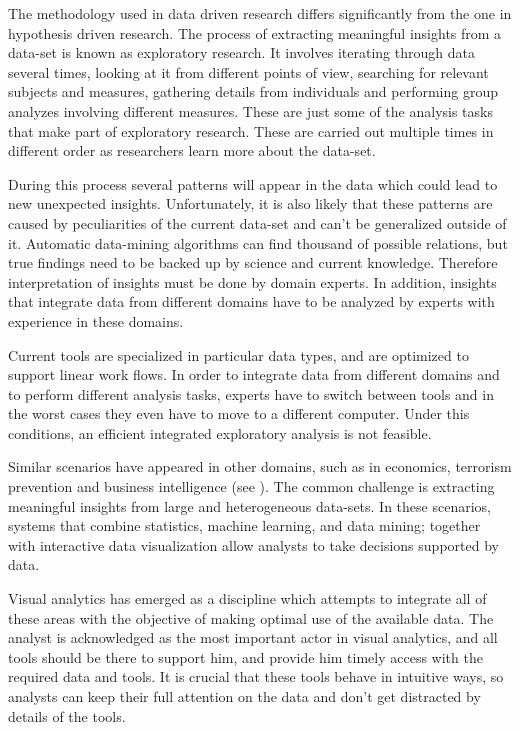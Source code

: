 \documentclass[utf8,paper]{frontiersSCNS} %
\begin{document}
The methodology used in data driven research differs significantly from the one in hypothesis driven research. The process of extracting meaningful insights from a data-set is known as exploratory research. It involves iterating through data several times, looking at it from different points of view, searching for relevant subjects and measures, gathering details from individuals and performing group analyzes involving different measures. These are just some of the analysis tasks that make part of exploratory research. These are carried out multiple times in different order as researchers learn more about the data-set. 

During this process several patterns will appear in the data which could lead to new unexpected insights. Unfortunately, it is also likely that these patterns are caused by peculiarities of the current data-set and can't be generalized outside of it. Automatic data-mining algorithms can find thousand of possible relations, but true findings need to be backed up by science and current knowledge. Therefore interpretation of insights must be done by domain experts. In addition, insights that integrate data from different domains have to be analyzed by experts with experience in these domains. 

Current tools are specialized in particular data types, and are optimized to support linear work flows. In order to integrate data from different domains and to perform different analysis tasks, experts have to switch between tools  and in the worst cases they even have to move to a different computer. Under this conditions, an efficient integrated exploratory analysis is not feasible. 
					
Similar scenarios have appeared in other domains, such as in economics, terrorism prevention and business intelligence (see \cite{cook_illuminating_2005}). The common challenge is extracting meaningful insights from large and heterogeneous data-sets. In these scenarios, systems that combine statistics, machine learning, and data mining; together with interactive data visualization allow analysts to take decisions supported by data. 

Visual analytics \citep{keim_visual_2008} has emerged as a discipline which attempts to integrate all of these areas with the objective of making optimal use of the available data. The analyst is acknowledged as the most important actor in visual analytics, and all tools should be there to support him, and provide him timely access with the required data and tools. It is crucial that these tools behave in intuitive ways, so analysts can keep their full attention on the data and don't get distracted by details of the tools. 
					
\end{document}
